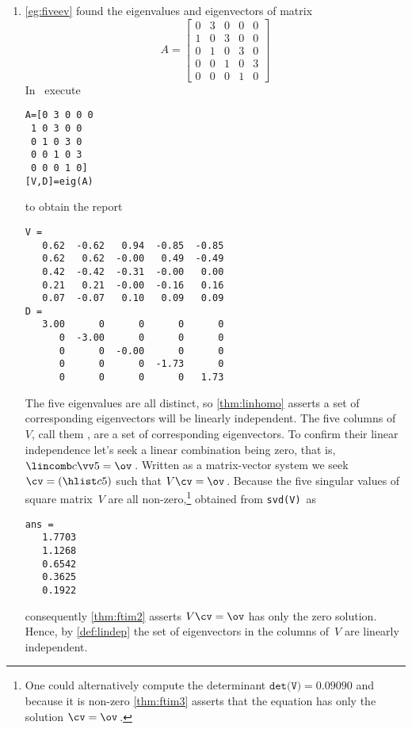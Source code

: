 \begin{example}
\begin{enumerate}
\item\label{eg:indepeva} \autoref{eg:fiveev} found the eigenvalues and eigenvectors of matrix
\begin{equation*}
A=\begin{bmatrix}0&3&0&0&0
\\1&0&3&0&0
\\0&1&0&3&0
\\0&0&1&0&3
\\0&0&0&1&0\end{bmatrix}
\end{equation*}
In \script\ execute
\begin{verbatim}
A=[0 3 0 0 0
 1 0 3 0 0
 0 1 0 3 0
 0 0 1 0 3
 0 0 0 1 0]
[V,D]=eig(A)
\end{verbatim}
\setbox\ajrqrbox\hbox{}%
\marginpar{\usebox{\ajrqrbox}}%
to obtain the report \twodp
\begin{verbatim}
V =
   0.62  -0.62   0.94  -0.85  -0.85
   0.62   0.62  -0.00   0.49  -0.49
   0.42  -0.42  -0.31  -0.00   0.00
   0.21   0.21  -0.00  -0.16   0.16
   0.07  -0.07   0.10   0.09   0.09
D =
   3.00      0      0      0      0
      0  -3.00      0      0      0
      0      0  -0.00      0      0
      0      0      0  -1.73      0
      0      0      0      0   1.73
\end{verbatim}
The five eigenvalues are all distinct, so \autoref{thm:linhomo} asserts a set of corresponding eigenvectors will be linearly independent.
The five columns of~\(V\), call them \hlist{}, are a set of corresponding eigenvectors.
To confirm their linear independence let's seek a linear combination being zero, that is, \(\lincomb c\vv5=\ov\)\,.
Written as a matrix-vector system we seek \(\cv=(\hlist c5)\) such that \(V\cv=\ov\)\,.
Because the five singular values of square matrix~\(V\) are all non-zero,\footnote{One could alternatively compute the determinant \(\texttt{det(V)}=0.09090\) and because it is non-zero \autoref{thm:ftim3} asserts that the equation has only the solution \(\cv=\ov\)\,.} obtained from \verb|svd(V)|~as
\begin{verbatim}
ans =
   1.7703
   1.1268
   0.6542
   0.3625
   0.1922
\end{verbatim}
consequently \autoref{thm:ftim2} asserts \(V\cv=\ov\) has only the zero solution.
Hence, by \autoref{def:lindep} the set of eigenvectors in the columns of~\(V\) are linearly independent. 

\end{enumerate}
\end{example}


